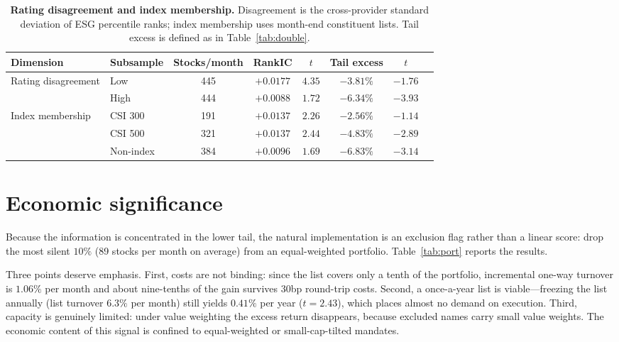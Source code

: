 \documentclass[12pt]{article}
\begin{document}
\begin{table}[t]
\centering\small
\caption{\textbf{Rating disagreement and index membership.} Disagreement is
the cross-provider standard deviation of ESG percentile ranks; index membership
uses month-end constituent lists. Tail excess is defined as in
Table~\ref{tab:double}.}
\label{tab:disag}
\vspace{6pt}
\begin{tabular}{llcccccc}
\toprule
Dimension & Subsample & Stocks/month & RankIC & $t$ & Tail excess & $t$ \\
\midrule
\multirow{2}{*}{Rating disagreement} & Low & 445 & $\mathbf{+0.0177}$ & $\mathbf{4.35}$ & $-3.81\%$ & $-1.76$ \\
 & High & 444 & $+0.0088$ & $1.72$ & $\mathbf{-6.34\%}$ & $\mathbf{-3.93}$ \\
\midrule
\multirow{3}{*}{Index membership} & CSI 300 & 191 & $+0.0137$ & $2.26$ & $-2.56\%$ & $-1.14$ \\
 & CSI 500 & 321 & $+0.0137$ & $2.44$ & $-4.83\%$ & $-2.89$ \\
 & Non-index & 384 & $+0.0096$ & $1.69$ & $\mathbf{-6.83\%}$ & $\mathbf{-3.14}$ \\
\bottomrule
\end{tabular}
\end{table}

\section{Economic significance}
\label{sec:econ}

Because the information is concentrated in the lower tail, the natural
implementation is an exclusion flag rather than a linear score: drop the most
silent $10\%$ (89 stocks per month on average) from an equal-weighted
portfolio. Table~\ref{tab:port} reports the results.

Three points deserve emphasis. First, costs are not binding: since the list
covers only a tenth of the portfolio, incremental one-way turnover is $1.06\%$
per month and about nine-tenths of the gain survives 30bp round-trip costs.
Second, a once-a-year list is viable---freezing the list annually
(list turnover $6.3\%$ per month) still yields $0.41\%$ per year ($t=2.43$),
which places almost no demand on execution. Third, capacity is genuinely
limited: under value weighting the excess return disappears, because excluded
names carry small value weights. The economic content of this signal is
confined to equal-weighted or small-cap-tilted mandates.
\end{document}

